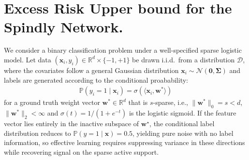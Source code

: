 \documentclass{article}
\theoremstyle{plain}
\theoremstyle{definition}
\theoremstyle{remark}
\begin{document}
{%










\section{Excess Risk Upper bound for the Spindly Network.} 

We consider a binary classification problem under a well-specified sparse logistic model. 
Let data $(\mathbf{x}_i, y_i) \in \mathbb{R}^d \times \{-1, +1\}$ be drawn i.i.d.\ from a distribution $\mathcal{D}$, 
where the covariates follow a general Gaussian distribution $\mathbf{x}_i \sim \mathcal{N}(\mathbf{0}, \mathbf{\Sigma})$ 
and labels are generated according to the conditional proabability:
\begin{align}
\label{sparse-data}
    \mathbb{P}(y_i = 1 \mid \mathbf{x}_i) = \sigma(\langle \mathbf{x}_i, \mathbf{w}^* \rangle)
\end{align}
for a ground truth weight vector $\mathbf{w}^* \in \mathbb{R}^d$ that is $s$-sparse, 
i.e., $\|\mathbf{w}^*\|_0 = s <d$, $\|\mathbf{w}^*\|_2 < \infty$ and $\sigma(t) = 1/(1 + e^{-t})$ is the logistic sigmoid. If the feature vector lies entirely in the inactive subspace of $\mathbf{w}^\star$, the conditional label distribution reduces to $\mathbb{P}(y=1\mid \mathbf{x})=0.5$, yielding pure noise with no label information, so effective learning requires suppressing variance in these directions while recovering signal on the sparse active support.

}
\end{document}
